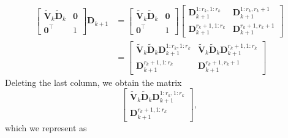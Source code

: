 \documentclass[11pt,a4paper]{article}
\newcommand{\0}{\M{0}}
\newcommand{\M}[1]{\mathbf{#1}}
\newcommand{\Mt}[1]{\tilde{\M{#1}}}
\newcommand{\T}{\top}
\begin{document}
\begin{align*}
  \begin{bmatrix}
    \Mt{V}_k \Mt{D}_k & \0
    \\
    \0^\T & 1
  \end{bmatrix}
            \M{D}_{k+1}
          & =
            \begin{bmatrix}
              \Mt{V}_k \Mt{D}_k & \0
              \\
              \0^\T & 1
            \end{bmatrix}
                      \begin{bmatrix}
                        \M{D}^{1:r_k, 1:r_k}_{k+1} & \M{D}^{1:r_k, r_k+1}_{k+1}
                        \\
                        \M{D}^{r_k+1, 1:r_k}_{k+1} & \M{D}^{r_k+1, r_k+1}_{k+1}
                      \end{bmatrix}
  \\
                      & =
                        \begin{bmatrix}
                          \Mt{V}_k \Mt{D}_k \M{D}^{1:r_k, 1:r_k}_{k+1}
                          &
                           \Mt{V}_k \Mt{D}_k \M{D}^{r_k+1, 1:r_k}_{k+1} 
                          \\
                          \M{D}^{r_k+1, 1:r_k}_{k+1}
                          &
                          \M{D}^{r_k+1, r_k+1}_{k+1}
                        \end{bmatrix}
\end{align*}
Deleting the last column, we obtain the matrix
\begin{displaymath}
  \begin{bmatrix}
    \Mt{V}_k \Mt{D}_k \M{D}^{1:r_k, 1:r_k}_{k+1}
    \\
    \M{D}^{r_k+1, 1:r_k}_{k+1}
  \end{bmatrix},
\end{displaymath}
which we represent as
\end{document}
